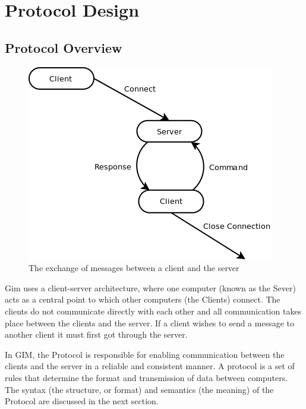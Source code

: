 \newcommand\SLASH{\char`\\}

\section{Protocol Design}

\subsection{Protocol Overview}

\begin{figure}[!h]
    \begin{center}
        \includegraphics[scale=0.65]{chapter2/diagrams/protocol_high_level.png}
        \caption{The exchange of messages between a client and the server}
        \label{highLevelDia}
    \end{center}
\end{figure}

Gim uses a client-server architecture, where one computer (known as the Sever) acts as a central point to which other computers (the Clients) connect. The clients do not communicate directly with each other and all communication takes place between the clients and the server. If a client wishes to send a message to another client it must first got through the server.

In GIM, the Protocol is responsible for enabling communication between the clients and the server in a reliable and consistent manner. A protocol is a set of rules that determine the format and transmission of data between computers. The syntax (the structure, or format) and semantics (the meaning) of the Protocol are discussed in the next section.

